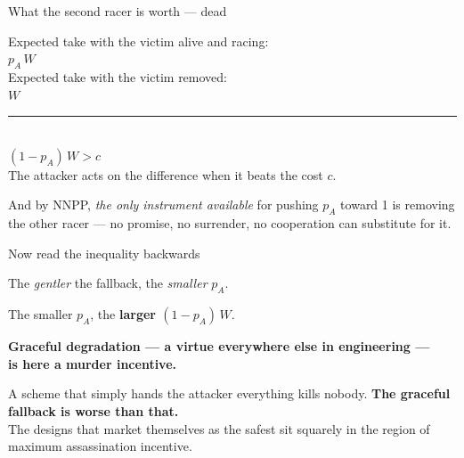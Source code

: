 \documentclass[aspectratio=169,12pt]{beamer}
\newcommand{\punch}[1]{{\color{accentdark}\bfseries #1}}
\newcommand{\bad}[1]{{\color{attackcol}\bfseries #1}}
\begin{document}
\begin{frame}[t]{What the second racer is worth --- dead}
  \vspace{0.61em}
  \begin{center}
    {\small Expected take with the victim alive and racing:}\\[0.2em]
    {\Large $p_A\,W$}\\[0.6em]
    {\small Expected take with the victim removed:}\\[0.2em]
    {\Large $W$}\\[0.7em]
    {\color{accentdark}\rule{0.5\textwidth}{0.8pt}}\\[0.6em]
    {\color{attackcol}\huge\bfseries $(1-p_A)\,W > c$}\\[0.5em]
    {\small The attacker acts on the difference when it beats the cost $c$.}
  \end{center}
  \vfill
  {\footnotesize\color{graytext}
   And by NNPP, \emph{the only instrument available} for pushing $p_A$ toward 1
   is removing the other racer --- no promise, no surrender, no cooperation can
   substitute for it.}
  \vspace{0.17em}
\end{frame}

\begin{frame}[t]{Now read the inequality backwards}
  \vspace{0.4em}
  \begin{center}
    {\large The \emph{gentler} the fallback, the \emph{smaller} $p_A$.\par}
    \vspace{0.28em}
    {\large The smaller $p_A$, the \bad{larger $(1-p_A)\,W$}.\par}
    \vspace{0.6em}
    {\color{accentdark}\Large\bfseries
     Graceful degradation --- a virtue everywhere else in engineering ---\\[0.2em]
     is here a \bad{murder incentive}.\par}
  \end{center}
  \vfill
  {\small A scheme that simply hands the attacker everything kills nobody.
   \punch{The graceful fallback is worse than that.}}\\[0.35em]
  {\footnotesize\color{graytext}
   The designs that market themselves as the safest sit squarely in the region of
   maximum assassination incentive.}
\end{frame}
\end{document}
